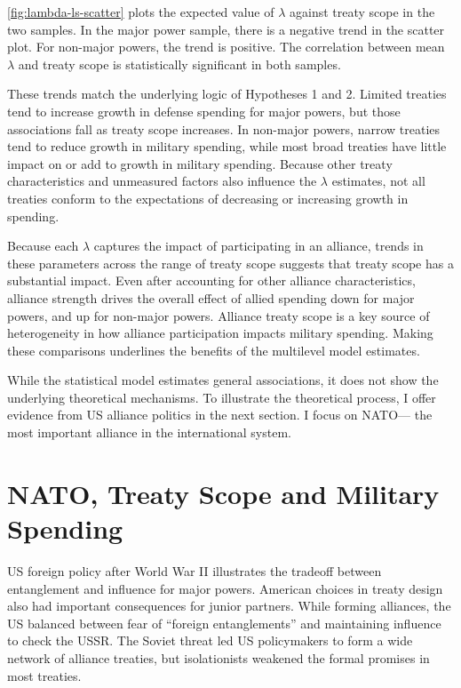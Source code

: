 \documentclass[12pt]{article}
\begin{document}
\autoref{fig:lambda-ls-scatter} plots the expected value of $\lambda$ against treaty scope in the two samples. 
In the major power sample, there is a negative trend in the scatter plot.
For non-major powers, the trend is positive.
The correlation between mean $\lambda$ and treaty scope is statistically significant in both samples. 


These trends match the underlying logic of Hypotheses 1 and 2. 
Limited treaties tend to increase growth in defense spending for major powers, but those associations fall as treaty scope increases. 
In non-major powers, narrow treaties tend to reduce growth in military spending, while most broad treaties have little impact on or add to growth in military spending. 
Because other treaty characteristics and unmeasured factors also influence the $\lambda$ estimates, not all treaties conform to the expectations of decreasing or increasing growth in spending. 


Because each $\lambda$ captures the impact of participating in an alliance, trends in these parameters across the range of treaty scope suggests that treaty scope has a substantial impact. 
Even after accounting for other alliance characteristics, alliance strength drives the overall effect of allied spending down for major powers, and up for non-major powers. 
Alliance treaty scope is a key source of heterogeneity in how alliance participation impacts military spending. 
Making these comparisons underlines the benefits of the multilevel model estimates. 


While the statistical model estimates general associations, it does not show the underlying theoretical mechanisms. 
To illustrate the theoretical process, I offer evidence from US alliance politics in the next section.  
I focus on NATO--- the most important alliance in the international system.  


\section{NATO, Treaty Scope and Military Spending}


US foreign policy after World War II illustrates the tradeoff between entanglement and influence for major powers.
American choices in treaty design also had important consequences for junior partners. 
While forming alliances, the US balanced between fear of ``foreign entanglements'' and maintaining influence to check the USSR.
The Soviet threat led US policymakers to form a wide network of alliance treaties, but isolationists weakened the formal promises in most treaties. 
\end{document}
